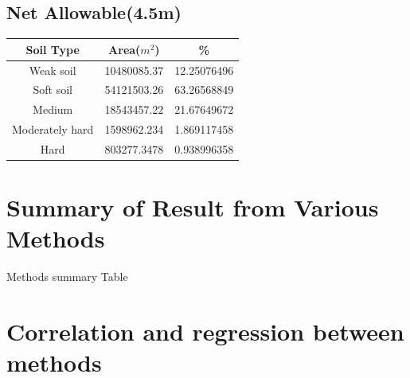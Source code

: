 \begin{center}
\subsection{Net Allowable(4.5m)}
\begin{tabular}{|c | c | c|} 
\hline
Soil Type & Area($m^2$) & \% \\
\hline
Weak soil & 10480085.37 & 12.25076496 \\
Soft soil & 54121503.26 & 63.26568849\\
Medium & 18543457.22 & 21.67649672\\
Moderately hard & 1598962.234 & 1.869117458\\
Hard & 803277.3478 & 0.938996358\\
\hline
\end{tabular}
\end{center}

\pagebreak

\section{Summary of Result from Various Methods}
\begin{table}[!h]
\caption{Methods summary Table}

\end{table}
\pagebreak

\section{Correlation and regression between methods}
